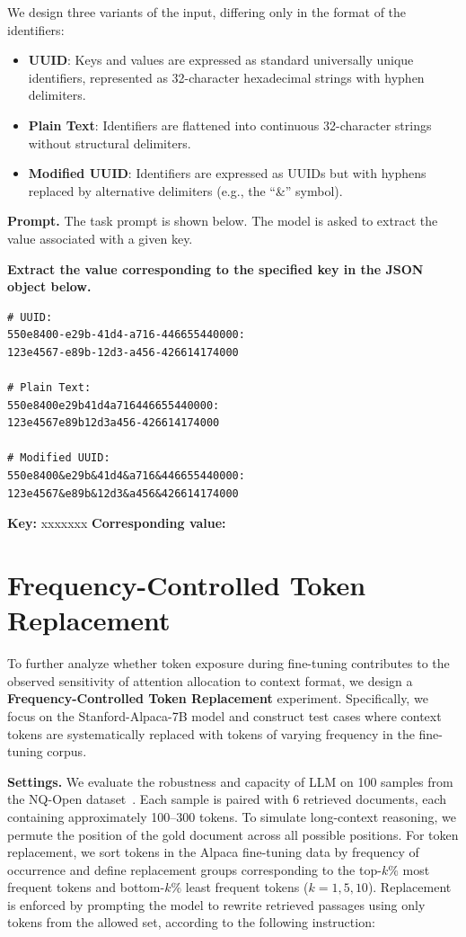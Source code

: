 \documentclass{article} %
\begin{document}
We design three variants of the input, differing only in the format of the identifiers:  
\begin{itemize}[leftmargin=*]
    \item \textbf{UUID}: Keys and values are expressed as standard universally unique identifiers, represented as 32-character hexadecimal strings with hyphen delimiters. 
    \item \textbf{Plain Text}: Identifiers are flattened into continuous 32-character strings without structural delimiters. 
    \item \textbf{Modified UUID}: Identifiers are expressed as UUIDs but with hyphens replaced by alternative delimiters (e.g., the “\&” symbol).  
\end{itemize}

\textbf{Prompt.}  
The task prompt is shown below. The model is asked to extract the value associated with a given key.  
\begin{tcolorbox}[colback=gray!3, colframe=black!20, title=Task Prompt]
\textbf{Extract the value corresponding to the specified key in the JSON object below.}

\begin{verbatim}
# UUID:
550e8400-e29b-41d4-a716-446655440000: 
123e4567-e89b-12d3-a456-426614174000

# Plain Text:
550e8400e29b41d4a716446655440000: 
123e4567e89b12d3a456-426614174000

# Modified UUID:
550e8400&e29b&41d4&a716&446655440000: 
123e4567&e89b&12d3&a456&426614174000
\end{verbatim}
\vspace{1em}

\textbf{Key: } \quad xxxxxxx \quad
\textbf{Corresponding value:}
\end{tcolorbox}

\section{Frequency-Controlled Token Replacement}\label{tokenreplace}
To further analyze whether token exposure during fine-tuning contributes to the observed sensitivity of attention allocation to context format, we design a \textbf{Frequency-Controlled Token Replacement} experiment. Specifically, we focus on the Stanford-Alpaca-7B model and construct test cases where context tokens are systematically replaced with tokens of varying frequency in the fine-tuning corpus.

\textbf{Settings.}
We evaluate the robustness and capacity of LLM on 100 samples from the NQ-Open dataset~\citep{DBLP:journals/tacl/LiuLHPBPL24}. Each sample is paired with 6 retrieved documents, each containing approximately 100–300 tokens. To simulate long-context reasoning, we permute the position of the gold document across all possible positions. For token replacement, we sort tokens in the Alpaca fine-tuning data by frequency of occurrence and define replacement groups corresponding to the top-$k\%$ most frequent tokens and bottom-$k\%$ least frequent tokens ($k=1,5,10$). Replacement is enforced by prompting the model to rewrite retrieved passages using only tokens from the allowed set, according to the following instruction:
\end{document}
